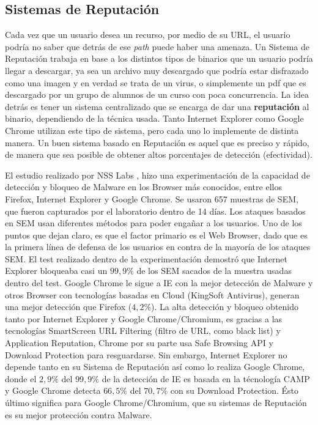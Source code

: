  \subsection{Sistemas de Reputación}
    Cada vez que un usuario desea un recurso, por medio de su URL, el usuario podría no saber que detrás de ese \textit{path} puede haber una amenaza. Un Sistema de Reputación trabaja en base a los distintos tipos de binarios que un usuario podría llegar a descargar, ya sea un archivo muy descargado que podría estar disfrazado como una imagen y en verdad se trata de un virus, o simplemente un pdf que es descargado por un grupo de alumnos de un curso con poca concurrencia. La idea detrás es tener un sistema centralizado que se encarga de dar una \textbf{reputación} al binario, dependiendo de la técnica usada. Tanto Internet Explorer como Google Chrome utilizan este tipo de sistema, pero cada uno lo implemente de distinta manera. Un buen sistema basado en Reputación es aquel que es preciso y rápido, de manera que sea posible de obtener altos porcentajes de detección (efectividad).

    El estudio realizado por NSS Labs \cite{rowSecSEMBlock}, hizo una experimentación de la capacidad de detección y bloqueo de Malware en los Browser más conocidos, entre ellos Firefox, Internet Explorer y Google Chrome. Se usaron 657 muestras de SEM, que fueron capturados por el laboratorio dentro de 14 días. Los ataques basados en SEM usan diferentes métodos para poder engañar a los usuarios. Uno de los puntos que dejan claro, es que el factor primario es el Web Browser, dado que es la primera línea de defensa de los usuarios en contra de la mayoría de los ataques SEM. El test realizado dentro de la experimentación demostró que Internet Explorer bloqueaba casi un \(99,9\%\) de los SEM sacados de la muestra usadas dentro del test. Google Chrome le sigue a IE con la mejor detección de Malware y otros Browser con tecnologías basadas en Cloud (KingSoft Antivirus), generan una mejor detección que Firefox (\(4,2\%\)). La alta detección y bloqueo obtenido tanto por Internet Explorer y Google Chrome/Chromium, es gracias a las tecnologías SmartScreen URL Filtering (filtro de URL, como black list) y Application Reputation, Chrome por su parte usa Safe Browsing API y Download Protection para resguardarse. Sin embargo, Internet Explorer no depende tanto en su Sistema de Reputación así como lo realiza Google Chrome, donde el \(2,9\%\) del \(99,9\%\) de la detección de IE es basada en la técnología CAMP y Google Chrome detecta \(66,5\%\) del \(70,7\%\) con su Download Protection. Ésto último significa para Google Chrome/Chromium, que su sistemas de Reputación es su mejor protección contra Malware. 

